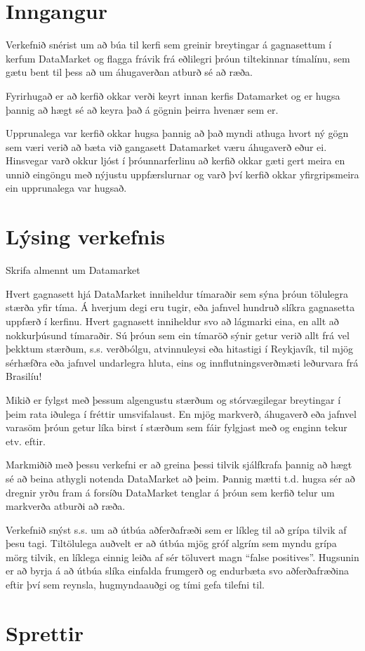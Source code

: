 \documentclass{article}
\begin{document}
\tableofcontents
\newpage

\section{Inngangur}
Verkefnið snérist um að búa til kerfi sem greinir breytingar á gagnasettum í kerfum DataMarket og flagga frávik frá eðlilegri þróun tiltekinnar tímalínu, sem gætu bent til þess að um áhugaverðan atburð sé að ræða.

Fyrirhugað er að kerfið okkar verði keyrt innan kerfis Datamarket og er hugsa þannig að hægt sé að keyra það á gögnin þeirra hvenær sem er.

Upprunalega var kerfið okkar hugsa þannig að það myndi athuga hvort ný gögn sem væri verið að bæta við gangasett Datamarket væru áhugaverð eður ei. Hinsvegar varð okkur ljóst í þróunnarferlinu að kerfið okkar gæti gert meira en unnið eingöngu með nýjustu uppfærslurnar og varð því kerfið okkar yfirgripsmeira ein upprunalega var hugsað.

\section{Lýsing verkefnis}
Skrifa almennt um Datamarket

Hvert gagnasett hjá DataMarket inniheldur tímaraðir sem sýna þróun tölulegra stærða yfir tíma. Á hverjum degi eru tugir, eða jafnvel hundruð slíkra gagnasetta uppfærð í kerfinu. Hvert gagnasett inniheldur svo að lágmarki eina, en allt að nokkurþúsund tímaraðir. Sú þróun sem ein tímaröð sýnir getur verið allt frá vel þekktum stærðum, s.s. verðbólgu, atvinnuleysi eða hitastigi í Reykjavík, til mjög sérhæfðra eða jafnvel undarlegra hluta, eins og innflutningsverðmæti leðurvara frá Brasilíu!

Mikið er fylgst með þessum algengustu stærðum og stórvægilegar breytingar í þeim rata iðulega í fréttir umsvifalaust. En mjög markverð, áhugaverð eða jafnvel varasöm þróun getur líka birst í stærðum sem fáir fylgjast með og enginn tekur etv. eftir.

Markmiðið með þessu verkefni er að greina þessi tilvik sjálfkrafa þannig að hægt sé að beina athygli notenda DataMarket að þeim. Þannig mætti t.d. hugsa sér að dregnir yrðu fram á forsíðu DataMarket tenglar á þróun sem kerfið telur um markverða atburði að ræða.

Verkefnið snýst s.s. um að útbúa aðferðafræði sem er líkleg til að grípa tilvik af þesu tagi. Tiltölulega auðvelt er að útbúa mjög gróf algrím sem myndu grípa mörg tilvik, en líklega einnig leiða af sér töluvert magn “false positives”. Hugsunin er að byrja á að útbúa slíka einfalda frumgerð og endurbæta svo aðferðafræðina eftir því sem reynsla, hugmyndaauðgi og tími gefa tilefni til.

\newpage

\section{Sprettir}
\end{document}
